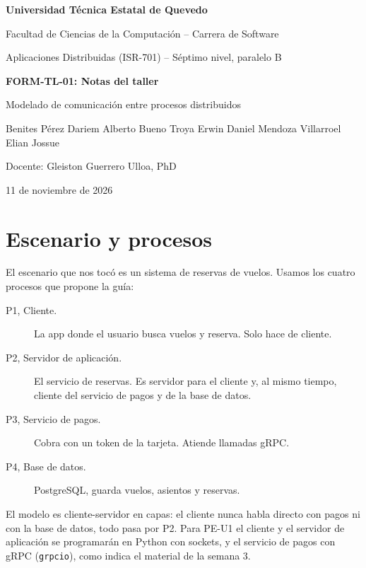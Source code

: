 \documentclass[11pt,a4paper]{article}
\begin{document}
\begin{center}
  {\large\bfseries Universidad Técnica Estatal de Quevedo\par}
  {Facultad de Ciencias de la Computación -- Carrera de Software\par}
  \vspace{4pt}
  {Aplicaciones Distribuidas (ISR-701) -- Séptimo nivel, paralelo B\par}
  \vspace{12pt}
  {\Large\bfseries FORM-TL-01: Notas del taller\par}
  \vspace{4pt}
  {\large Modelado de comunicación entre procesos distribuidos\par}
  \vspace{10pt}
  Benites Pérez Dariem Alberto \quad Bueno Troya Erwin Daniel \quad Mendoza Villarroel Elian Jossue\par
  Docente: Gleiston Guerrero Ulloa, PhD\par
  11 de noviembre de 2026\par
\end{center}

\section{Escenario y procesos}

El escenario que nos tocó es un sistema de reservas de vuelos. Usamos los cuatro procesos que propone la guía:

\begin{description}
  \item[P1, Cliente.] La app donde el usuario busca vuelos y reserva. Solo hace de cliente.
  \item[P2, Servidor de aplicación.] El servicio de reservas. Es servidor para el cliente y, al mismo tiempo, cliente del servicio de pagos y de la base de datos.
  \item[P3, Servicio de pagos.] Cobra con un token de la tarjeta. Atiende llamadas gRPC.
  \item[P4, Base de datos.] PostgreSQL, guarda vuelos, asientos y reservas.
\end{description}

El modelo es cliente-servidor en capas: el cliente nunca habla directo con pagos ni con la base de datos, todo pasa por P2. Para PE-U1 el cliente y el servidor de aplicación se programarán en Python con sockets, y el servicio de pagos con gRPC (\texttt{grpcio}), como indica el material de la semana 3.
\end{document}
